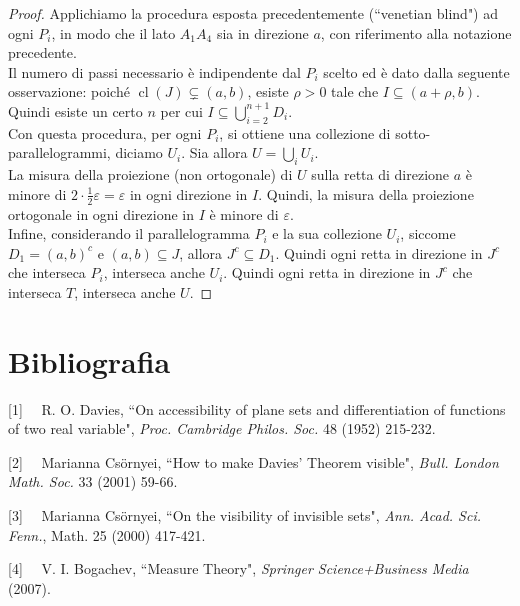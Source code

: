 \documentclass[a4paper, twoside]{article}
\newcommand{\<}{\langle}
\renewcommand{\>}{\rangle}
\begin{document}
\begin{proof}
	Applichiamo la procedura esposta precedentemente (``venetian blind") ad ogni $P_i$, in modo che il lato $A_1A_4$ sia in direzione $a$, con riferimento alla notazione precedente.\\
	Il numero di passi necessario è indipendente dal $P_i$ scelto ed è dato dalla seguente osservazione: poiché $\operatorname{cl}(J) \subsetneq(a, b)$, esiste $\rho >0$ tale che $I \subseteq (a+\rho,b)$. Quindi esiste un certo $n$ per cui $I \subseteq \bigcup_{i=2}^{n+1}D_i$.\\
	Con questa procedura, per ogni $P_i$, si ottiene una collezione di sotto-parallelogrammi, diciamo $U_i$. Sia allora $U = \bigcup_i U_i$.\\
	La misura della proiezione (non ortogonale) di $U$ sulla retta di direzione $a$ è minore di $2 \cdot \frac{1}{2} \varepsilon=\varepsilon$ in ogni direzione in $I$. Quindi, la misura della proiezione ortogonale in ogni direzione in $I$ è minore di $\varepsilon$.\\
	Infine, considerando il parallelogramma $P_i$ e la sua collezione $U_i$, siccome $D_1 =(a,b)^c$ e $(a,b) \subseteq J$, allora $J^c \subseteq D_1$. Quindi ogni retta in direzione in $J^c$ che interseca $P_i$, interseca anche $U_i$. Quindi ogni retta in direzione in $J^c$ che interseca $T$, interseca anche $U$. 
\end{proof}

\newpage

\section{Bibliografia}

[1] \ \ R. O. Davies, ``On accessibility of plane sets and differentiation
of functions of two real variable", \emph{Proc. Cambridge Philos. Soc.} 48 (1952) 215-232.

[2] \ \ Marianna Cs\"{o}rnyei, ``How to make Davies' Theorem visible", \emph{Bull. London Math. Soc.} 33 (2001) 59-66.

[3] \ \ Marianna Cs\"{o}rnyei, ``On the visibility of invisible sets",
\emph{Ann. Acad. Sci. Fenn.}, Math. 25 (2000) 417-421.

[4] \ \ V. I. Bogachev, ``Measure Theory", \emph{Springer Science+Business Media} (2007). 
\end{document}

